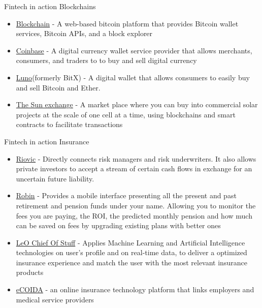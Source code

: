 \documentclass[11pt]{beamer}
\begin{document}
\begin{frame}{Fintech in action}
	Blockchains
	\begin{itemize}
		\item \href{http://blockchain.com/}{Blockchain} - A web-based bitcoin platform that provides Bitcoin wallet services, Bitcoin APIs, and a block explorer
		\item \href{https://www.coinbase.com}{Coinbase} - A digital currency wallet service provider that allows merchants, consumers, and traders to to buy and sell digital currency
		\item \href{https://www.luno.com/en/}{Luno}(formerly BitX) - A digital wallet that allows consumers to easily buy and sell Bitcoin and Ether. %
		\item \href{https://thesunexchange.com/}{The Sun exchange} - A market place where you can buy into commercial solar projects at the scale of one cell at a time, using blockchains and smart contracts to facilitate transactions
	\end{itemize}
\end{frame}



\begin{frame}{Fintech in action}
	Insurance
	\begin{itemize}
		\item \href{riovic.com/}{Riovic} - Directly connects risk managers and risk underwriters. It also allows private investors to accept a stream of certain cash flows in exchange for an uncertain future liability.
		\item \href{https://www.robinhoodpro.com}{Robin} - Provides a mobile interface presenting all the present and past retirement and pension funds under your name. Allowing you to monitor the fees you are paying, the ROI, the predicted monthly pension and how much can be saved on fees by upgrading existing plans with better ones
		\item \href{http://www.meetleo.co}{LeO Chief Of Stuff} - Applies Machine Learning and Artificial Intelligence technologies on user's profile and on real-time data, to deliver a optimized insurance experience and match the user with the most relevant insurance products
		\item \href{compsol.co.za/}{eCOIDA} - an online insurance technology platform that links employers and medical service providers
	\end{itemize}
\end{frame}
\end{document}

